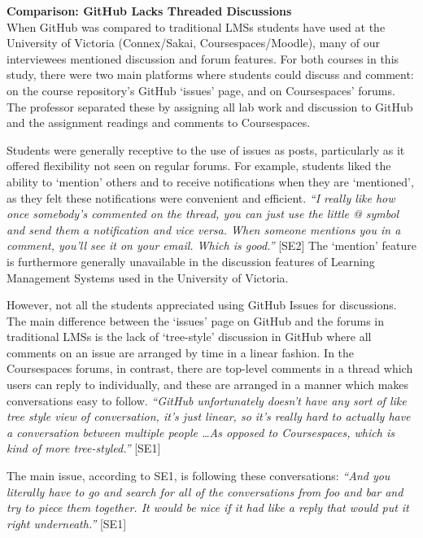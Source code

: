\textbf{Comparison: GitHub Lacks Threaded Discussions} \\
When GitHub was compared to traditional LMSs students have used at the University of Victoria (Connex/Sakai, Coursespaces/Moodle), many of our interviewees mentioned discussion and forum features. For both courses in this study, there were two main platforms where students could discuss and comment: on the course repository's GitHub `issues' page, and on Coursespaces' forums. The professor separated these by assigning all lab work and discussion to GitHub and the assignment readings and comments to Coursespaces.

Students were generally receptive to the use of issues as posts, particularly as it offered flexibility not seen on regular forums. For example, students liked the ability to `mention' others and to receive notifications when they are `mentioned', as they felt these notifications were convenient and efficient. \textit{``I really like how once somebody's commented on the thread, you can just use the little @ symbol and send them a notification and vice versa. When someone mentions you in a comment, you'll see it on your email. Which is good.''} [SE2] The `mention' feature is furthermore generally unavailable in the discussion features of Learning Management Systems used in the University of Victoria.

However, not all the students appreciated using GitHub Issues for discussions. The main difference between the `issues' page on GitHub and the forums in traditional LMSs is the lack of `tree-style' discussion in GitHub where all comments on an issue are arranged by time in a linear fashion. In the Coursespaces forums, in contrast, there are top-level comments in a thread which users can reply to individually, and these are arranged in a manner which makes conversations easy to follow. \textit{``GitHub unfortunately doesn't have any sort of like tree style view of conversation, it's just linear, so it's really hard to actually have a conversation between multiple people \ldots As opposed to Coursespaces, which is kind of more tree-styled.''} [SE1]

The main issue, according to SE1, is following these conversations: \textit{``And you literally have to go and search for all of the conversations from foo and bar and try to piece them together. It would be nice if it had like a reply that would put it right underneath.''} [SE1]



